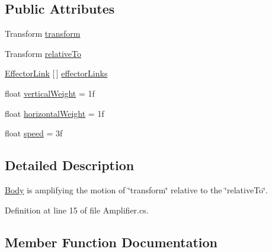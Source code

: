 \subsection*{Public Attributes}
\begin{DoxyCompactItemize}
\item 
Transform \mbox{\hyperlink{class_root_motion_1_1_final_i_k_1_1_amplifier_1_1_body_a908c3728b8b834ccd1f2f58c5496f5ae}{transform}}
\item 
Transform \mbox{\hyperlink{class_root_motion_1_1_final_i_k_1_1_amplifier_1_1_body_aa04fc5167c0e70f47eaff256261a2c6e}{relative\+To}}
\item 
\mbox{\hyperlink{class_root_motion_1_1_final_i_k_1_1_amplifier_1_1_body_1_1_effector_link}{Effector\+Link}} \mbox{[}$\,$\mbox{]} \mbox{\hyperlink{class_root_motion_1_1_final_i_k_1_1_amplifier_1_1_body_a42f043a979c9902b7614bb0f6638399a}{effector\+Links}}
\item 
float \mbox{\hyperlink{class_root_motion_1_1_final_i_k_1_1_amplifier_1_1_body_a19f95f2c05f02fcae8ed9f8c40d78381}{vertical\+Weight}} = 1f
\item 
float \mbox{\hyperlink{class_root_motion_1_1_final_i_k_1_1_amplifier_1_1_body_aa32c2a26ca66ab704ea8f3d3145ac17a}{horizontal\+Weight}} = 1f
\item 
float \mbox{\hyperlink{class_root_motion_1_1_final_i_k_1_1_amplifier_1_1_body_ad90842bf5f84404e8ff00456f7c1d217}{speed}} = 3f
\end{DoxyCompactItemize}


\subsection{Detailed Description}
\mbox{\hyperlink{class_root_motion_1_1_final_i_k_1_1_amplifier_1_1_body}{Body}} is amplifying the motion of \char`\"{}transform\char`\"{} relative to the \char`\"{}relative\+To\char`\"{}. 



Definition at line 15 of file Amplifier.\+cs.



\subsection{Member Function Documentation}
\mbox{\label{class_root_motion_1_1_final_i_k_1_1_amplifier_1_1_body_a64f2fe68e3ccdbcc8ea8ec234481c212}} 
